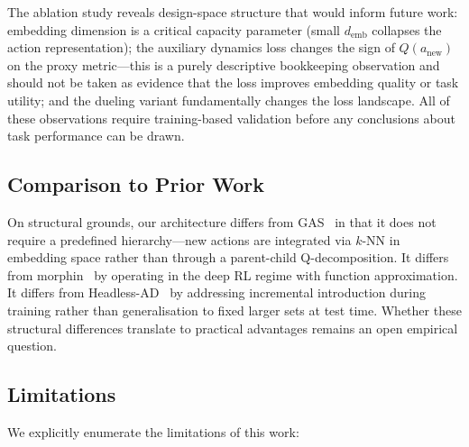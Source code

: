 \documentclass{article}
\begin{document}
The ablation study reveals design-space structure that would inform future work: embedding dimension is a critical capacity parameter (small $d_\text{emb}$ collapses the action representation); the auxiliary dynamics loss changes the sign of $Q(a_\text{new})$ on the proxy metric---this is a purely descriptive bookkeeping observation and should not be taken as evidence that the loss improves embedding quality or task utility; and the dueling variant fundamentally changes the loss landscape. All of these observations require training-based validation before any conclusions about task performance can be drawn.

\subsection{Comparison to Prior Work}

On structural grounds, our architecture differs from GAS~\cite{farquhar2020growing} in that it does not require a predefined hierarchy---new actions are integrated via $k$-NN in embedding space rather than through a parent-child Q-decomposition. It differs from morphin~\cite{delarosa2026morphin} by operating in the deep RL regime with function approximation. It differs from Headless-AD~\cite{sinii2023headless} by addressing incremental introduction during training rather than generalisation to fixed larger sets at test time. Whether these structural differences translate to practical advantages remains an open empirical question.

\subsection{Limitations}
\label{sec:limitations}

We explicitly enumerate the limitations of this work:
\end{document}
